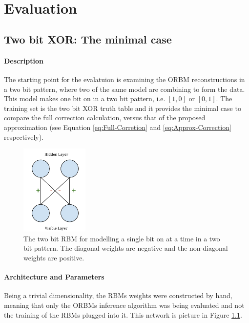 \chapter{Evaluation}

\section{Two bit XOR: The minimal case}\label{S:XOR}

\subsubsection{Description}

The starting point for the evalatuion is examining the ORBM reconstructions in a two bit pattern, where two of the same model are combining to form the data. This model makes one bit on in a two bit pattern, i.e. $[1 , 0]$ or $[0 , 1]$. The training set is the two bit XOR truth table and it provides the minimal case to compare the full correction calculation, versus that of the proposed approximation (see Equation \ref{eq:Full-Corretion} and \ref{eq:Approx-Correction} respectively).

\begin{figure}[h]
  \begin{center}
    \includegraphics[width=0.3\textwidth]{Assets/Two-Bit-RBM.png}
  \end{center}
  \caption{The two bit RBM for modelling a single bit on at a time in a two bit pattern. The diagonal weights are negative and the non-diagonal weights are positive.}
  \label{F:Two-Bit-RBM}
\end{figure}

\subsubsection{Architecture and Parameters}


Being a trivial dimensionality, the RBMs weights were constructed by hand, meaning that only the ORBMs inference algorithm was being evaluated and not the training of the RBMs plugged into it. This network is picture in Figure \ref{F:Two-Bit-RBM}.

